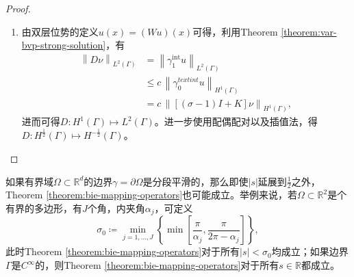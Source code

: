 \begin{proof}
\begin{enumerate}
  \item 由双层位势的定义$u(x) = \left( W u \right)(x)$可得，利用Theorem \ref{theorem:var-bvp-strong-solution}，有
  \begin{equation*}
    \begin{split}
      \left\| D \nu \right\|_{L^{2}(\Gamma)}
      & = \left\| \gamma_{1}^{\text{int}} u \right\|_{L^{2}(\Gamma)} \\
      & \le c \, \left\| \gamma_{0}^{text{int}} u \right\|_{H^{1}(\Gamma)} \\
      & = c \, \left\|
      \left[
      \left( \sigma - 1 \right) I + K
      \right] \nu
      \right\|_{H^{1}(\Gamma)},
    \end{split}
  \end{equation*}
  进而可得$D:H^{1}(\Gamma) \mapsto L^{2}(\Gamma)$。进一步使用配偶配对以及插值法，得$D:H^{\frac{1}{2}}(\Gamma) \mapsto H^{-\frac{1}{2}}(\Gamma)$。
\end{enumerate}
\end{proof}

如果有界域$\Omega \subset \mathbb{R}^{d}$的边界$\gamma = \partial \Omega$是分段平滑的，那么即使$\left| s \right|$延展到$\frac{1}{2}$之外，Theorem \ref{theorem:bie-mapping-operators}也可能成立。举例来说，若$\Omega \subset \mathbb{R}^{2}$是个有界的多边形，有$J$个角，内夹角$\alpha_{j}$，可定义
\begin{equation*}
  \sigma_{0} \coloneqq \min_{j=1,\ldots,J}
  \left\{
  \min
  \left[
  \frac{\pi}{\alpha_{j}},
  \frac{\pi}{2 \pi - \alpha_{j}}
  \right]
  \right\},
\end{equation*}
此时Theorem \ref{theorem:bie-mapping-operators}对于所有$\left| s \right| < \sigma_{0}$均成立\citep{Costabel:1985dl}；如果边界$\Gamma$是$C^{\infty}$的，则Theorem \ref{theorem:bie-mapping-operators}对于所有$s \in \mathbb{R}$都成立。
